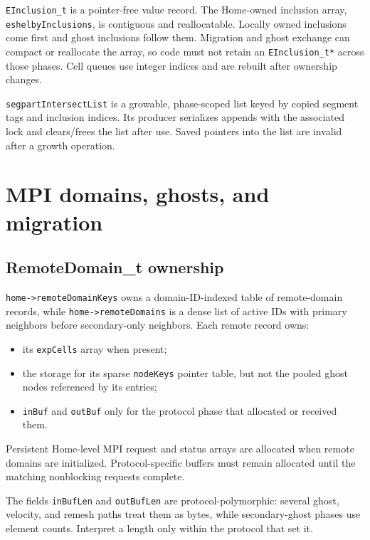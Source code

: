 \documentclass[11pt]{article}
\newcommand{\code}[1]{\texorpdfstring{\nolinkurl{#1}}{#1}}
\begin{document}
\code{EInclusion_t} is a pointer-free value record.  The Home-owned inclusion
array, \code{eshelbyInclusions}, is contiguous and reallocatable.  Locally
owned inclusions come first and ghost inclusions follow them.  Migration and
ghost exchange can compact or reallocate the array, so code must not retain
an \code{EInclusion_t*} across those phases.  Cell queues use integer indices
and are rebuilt after ownership changes.

\code{segpartIntersectList} is a growable, phase-scoped list keyed by copied
segment tags and inclusion indices.  Its producer serializes appends with the
associated lock and clears/frees the list after use.  Saved pointers into the
list are invalid after a growth operation.

\section{MPI domains, ghosts, and migration}

\subsection{RemoteDomain\_t ownership}



\code{home->remoteDomainKeys} owns a domain-ID-indexed table of remote-domain
records, while \code{home->remoteDomains} is a dense list of active IDs with
primary neighbors before secondary-only neighbors.  Each remote record owns:

\begin{itemize}
\item its \code{expCells} array when present;
\item the storage for its sparse \code{nodeKeys} pointer table, but not the
pooled ghost nodes referenced by its entries;
\item \code{inBuf} and \code{outBuf} only for the protocol phase that
allocated or received them.
\end{itemize}

Persistent Home-level MPI request and status arrays are allocated when remote
domains are initialized.  Protocol-specific buffers must remain allocated
until the matching nonblocking requests complete.

The fields \code{inBufLen} and \code{outBufLen} are protocol-polymorphic:
several ghost, velocity, and remesh paths treat them as bytes, while
secondary-ghost phases use element counts.  Interpret a length only within
the protocol that set it.
\end{document}

